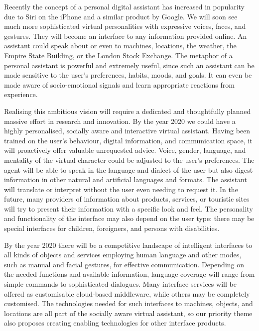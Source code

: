 \documentclass[10pt, plain]{../../metanetpaper}
\begin{document}
\begin{multicols}{2}
Recently the concept of a personal digital assistant has increased in popularity due to Siri on the iPhone and a similar product by Google. We will soon see much more sophisticated virtual personalities with expressive voices, faces, and gestures. They will become an interface to any information provided online. An assistant could speak about or even to machines, locations, the weather, the Empire State Building, or the London Stock Exchange. The metaphor of a personal assistant is powerful and extremely useful, since such an assistant can be made sensitive to the user’s preferences, habits, moods, and goals. It can even be made aware of socio-emotional signals and learn appropriate reactions from experience.  
 
Realising this ambitious vision will require a dedicated and thoughtfully planned massive effort in research and innovation. By the year 2020 we could have a highly personalised, socially aware and interactive virtual assistant. Having been trained on the user’s behaviour, digital information, and communication space, it will proactively offer valuable unrequested advice. Voice, gender, language, and mentality of the virtual character could be adjusted to the user’s preferences. The agent will be able to speak in the language and dialect of the user but also digest information in other natural and artificial languages and formats. The assistant will translate or interpret without the user even needing to request it. In the future, many providers of information about products, services, or touristic sites will try to present their information with a specific look and feel. The personality and functionality of the interface may also depend on the user type: there may be special interfaces for children, foreigners, and persons with disabilities.
 
By the year 2020 there will be a competitive landscape of intelligent interfaces to all kinds of objects and services employing human language and other modes, such as manual and facial gestures, for effective communication. Depending on the needed functions and available information, language coverage will range from simple commands to sophisticated dialogues. Many interface services will be offered as customisable cloud-based middleware, while others may be completely customised. The technologies needed for such interfaces to machines, objects, and locations are all part of the socially aware virtual assistant, so our priority theme also proposes creating enabling technologies for other interface products.
 

\end{multicols}
\end{document}
